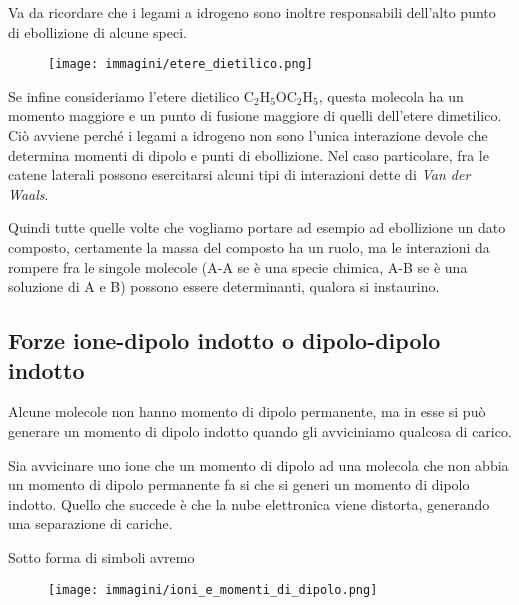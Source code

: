 \vspace{0.2cm}Va da ricordare che i legami a idrogeno sono inoltre responsabili dell'alto punto di ebollizione di alcune speci.

\hspace{0.5cm}\begin{minipage}{0.35 \textwidth}
    \begin{figure}[H]
        \texttt{[image: immagini/etere\_dietilico.png]}
    \end{figure}
\end{minipage}
\begin{minipage}{0.6 \textwidth}
    \vspace{0.6cm}Se infine consideriamo l'etere dietilico C$_2$H$_5$OC$_2$H$_5$, questa molecola ha un momento maggiore e un punto di fusione maggiore di quelli dell'etere dimetilico. Ciò avviene perché i legami a idrogeno non sono l'unica interazione devole che determina momenti di dipolo e punti di ebollizione. Nel caso particolare, fra le catene laterali possono esercitarsi alcuni tipi di interazioni dette di \textit{Van der Waals}.
\end{minipage}

\vspace{0.2cm}Quindi tutte quelle volte che vogliamo portare ad esempio ad ebollizione un dato composto, certamente la massa del composto ha un ruolo, ma le interazioni da rompere fra le singole molecole (A-A se è una specie chimica, A-B se è una soluzione di A e B) possono essere determinanti, qualora si instaurino.

\subsection{Forze ione-dipolo indotto o dipolo-dipolo indotto}
Alcune molecole non hanno momento di dipolo permanente, ma in esse si può generare un momento di dipolo indotto quando gli avviciniamo qualcosa di carico.

Sia avvicinare uno ione che un momento di dipolo ad una molecola che non abbia un momento di dipolo permanente fa si che si generi un momento di dipolo indotto. Quello che succede è che la nube elettronica viene distorta, generando una separazione di cariche.

Sotto forma di simboli avremo

\begin{figure}[htp]
    \centering
    \texttt{[image: immagini/ioni\_e\_momenti\_di\_dipolo.png]}
\end{figure}

